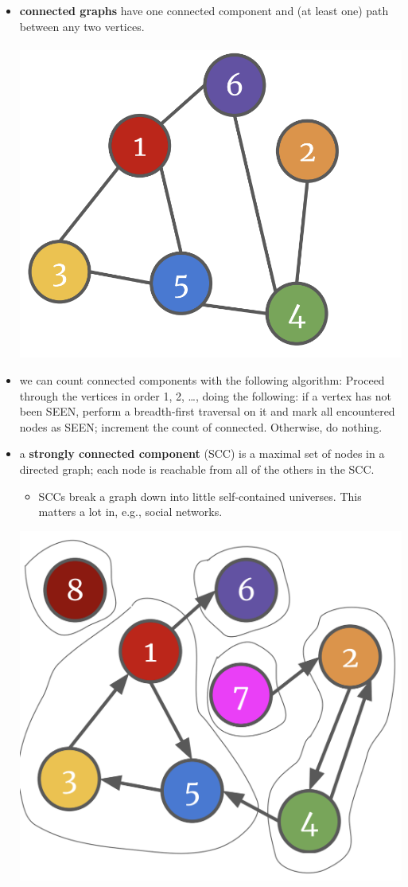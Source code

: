 \documentclass[12pt]{article}
\begin{document}
\begin{itemize}
\begin{itemize}
            \item \textbf{connected graphs} have one connected component and (at least one) path between any two vertices. \\\\ \includegraphics[scale=0.2]{connected.png}
            \item we can count connected components with the following algorithm: Proceed through the vertices in order 1, 2, …, doing the following: if a vertex has not been SEEN, perform a breadth-first traversal on it and mark all encountered nodes as SEEN; increment the count of connected. Otherwise, do nothing.
            \item a \textbf{strongly connected component} (SCC) is a maximal set of nodes in a directed graph; each node is reachable from all of the others in the SCC. 
            \begin{itemize}
                \item SCCs break a graph down into little self-contained universes. This matters a lot in, e.g., social networks.
            \end{itemize}
            \includegraphics[scale=0.2]{scc.png}

\end{itemize}
\end{itemize}
\end{document}
